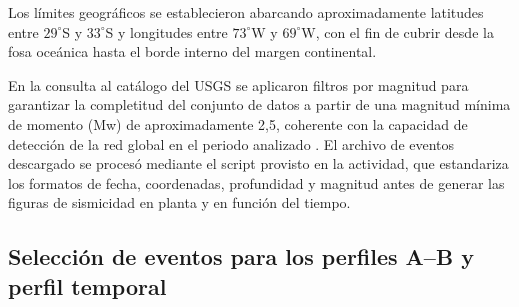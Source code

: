 \documentclass[a4paper,12pt]{article} %
\numberwithin{equation}{section} %
\numberwithin{figure}{section} %
\begin{document}
Los límites geográficos se establecieron abarcando aproximadamente latitudes entre $29^\circ$S y $33^\circ$S y longitudes entre $73^\circ$W y $69^\circ$W, con el fin de cubrir desde la fosa oceánica hasta el borde interno del margen continental.

En la consulta al catálogo del USGS se aplicaron filtros por magnitud para garantizar la completitud del conjunto de datos a partir de una magnitud mínima de momento (Mw) de aproximadamente 2{,}5, coherente con la capacidad de detección de la red global en el periodo analizado \cite{usgs_catalog}. El archivo de eventos descargado se procesó mediante el script provisto en la actividad, que estandariza los formatos de fecha, coordenadas, profundidad y magnitud antes de generar las figuras de sismicidad en planta y en función del tiempo.

\subsection{Selección de eventos para los perfiles A--B y perfil temporal}
\end{document}
